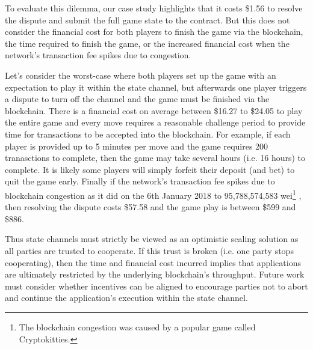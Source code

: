 \documentclass{llncs}
\begin{document}
	To evaluate this dilemma, our case study highlights that it costs \$1.56 to resolve the dispute and submit the full game state to the contract.
	But this does not consider the financial cost for both players to finish the game via the blockchain, the time required to finish the game, or the increased financial cost when the network's transaction fee spikes due to congestion. %
	
	Let's consider the worst-case where both players set up the game with an expectation to play it within the state channel, but afterwards one player triggers a dispute to turn off the channel and the game must be finished via the blockchain.
	There is a financial cost on average between \$16.27 to \$24.05 to play the entire game and every move requires a reasonable challenge period to provide time for transactions to be accepted into the blockchain.
	For example, if each player is provided up to 5 minutes per move and the game requires 200 tranasctions to complete, then the game may take several hours (i.e. 16 hours) to complete. 
	It is likely some players will simply forfeit their deposit (and bet) to quit the game early. 
	Finally if the network's transaction fee spikes due to blockchain congestion as it did on the 6th January 2018 to 95,788,574,583 wei\footnote{The blockchain congestion was caused by a popular game called Cryptokitties.}  \cite{etherscan}, then resolving the dispute costs \$57.58 and the game play is between \$599 and \$886.  %
	
	Thus state channels must strictly be viewed as an optimistic scaling solution as all parties are trusted to cooperate. 
	If this trust is broken (i.e. one party stops cooperating), then the time and financial cost incurred implies that applications are ultimately restricted by the underlying blockchain's throughput. 
	Future work must consider whether incentives can be aligned to encourage parties not to abort and continue the application's execution within the state channel.  
	
	
\end{document}
